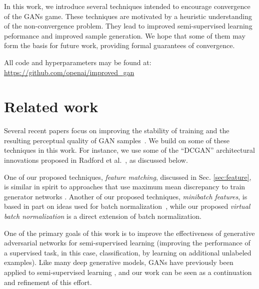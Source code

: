 \documentclass{article} \usepackage{nips14submit_e,times}
\begin{document}
In this work, we introduce several techniques intended to encourage convergence of
the GANs game.
These techniques are motivated by a heuristic understanding of the non-convergence
problem.
They lead to improved semi-supervised learning peformance and improved sample generation.
We hope that some of them may form the basis for future work, providing formal guarantees
of convergence.

All code and hyperparameters may be found at:
\url{https://github.com/openai/improved_gan}

\section{Related work}
\label{subsec:previous}
Several recent papers focus on improving the stability of training and the
resulting perceptual quality of GAN
samples~\cite{denton2015deep, radford2015unsupervised, im2016generating, yoo2016pixel}.
We build on some of these techniques in this work.
For instance, we use some of the ``DCGAN'' architectural innovations proposed
in Radford et al.~\cite{radford2015unsupervised}, as discussed below.


One of our proposed techniques, {\em feature matching}, discussed in Sec. \ref{sec:feature},
is similar in spirit to approaches that use maximum mean discrepancy \cite{gretton2005measuring, fukumizu2007kernel, smola2007hilbert}
to train generator networks \cite{Li-et-al-2015,dziugaite2015training}.
Another of our proposed techniques, {\em minibatch features}, is based in part on ideas used
for batch normalization~\cite{ioffe2015batch}, while our proposed 
 {\em virtual batch normalization} is a direct extension of batch normalization.



One of the primary goals of this work is to improve the effectiveness of generative
adversarial networks for semi-supervised learning (improving the performance of
a supervised task, in this case, classification, by learning on additional
unlabeled examples).
Like many deep generative models, GANs have previously been applied to
semi-supervised learning \cite{sutskever2015towards,springenberg2015unsupervised}, and our
work can be seen as a continuation and refinement of this effort.
\end{document}
